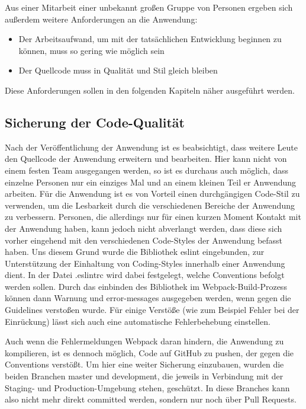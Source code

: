 Aus einer Mitarbeit einer unbekannt großen Gruppe von Personen ergeben sich außerdem weitere Anforderungen an die Anwendung:

\begin{itemize}
  \item Der Arbeitsaufwand, um mit der tatsächlichen Entwicklung beginnen zu können, muss so gering wie möglich sein
  \item Der Quellcode muss in Qualität und Stil gleich bleiben
\end{itemize}

Diese Anforderungen sollen in den folgenden Kapiteln näher ausgeführt werden.

\subsection{Sicherung der Code-Qualität}
Nach der Veröffentlichung der Anwendung ist es beabsichtigt, dass weitere Leute den Quellcode der Anwendung erweitern und bearbeiten. Hier kann nicht von einem festen Team ausgegangen werden, so ist es durchaus auch möglich, dass einzelne Personen nur ein einziges Mal und an einem kleinen Teil er Anwendung arbeiten. Für die Anwendung ist es von Vorteil einen durchgängigen Code-Stil zu verwenden, um die Lesbarkeit durch die verschiedenen Bereiche der Anwendung zu verbessern. Personen, die allerdings nur für einen kurzen Moment Kontakt mit der Anwendung haben, kann  jedoch nicht abverlangt werden, dass diese sich vorher eingehend mit den verschiedenen Code-Styles der Anwendung befasst haben. Uns diesem Grund wurde die Bibliothek eslint eingebunden, zur Unterstützung der Einhaltung von Coding-Styles innerhalb einer Anwendung dient.
In der Datei .eslintrc wird dabei festgelegt, welche Conventions befolgt werden sollen. Durch das einbinden des Bibliothek im Webpack-Build-Prozess können dann Warnung und error-messages ausgegeben werden, wenn gegen die Guidelines verstoßen wurde. Für einige Verstöße (wie zum Beispiel Fehler bei der Einrückung) lässt sich auch eine automatische  Fehlerbehebung einstellen.

Auch wenn die Fehlermeldungen Webpack daran hindern, die Anwendung zu kompilieren, ist es dennoch möglich, Code auf GitHub zu pushen, der gegen die Conventions verstößt. Um hier eine weiter Sicherung einzubauen, wurden die beiden Branchen master und development, die jeweils in Verbindung mit der Staging- und Production-Umgebung stehen, geschützt. In diese Branches kann also nicht mehr direkt committed werden, sondern nur noch über Pull Requests.


